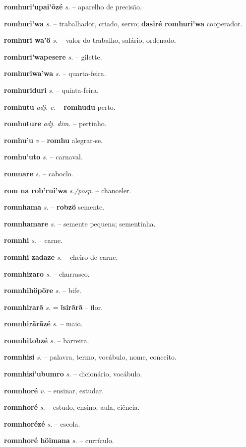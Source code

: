 \textbf{romhuri'upai'õzé} \textit{s.} -- aparelho de precisão.

\textbf{romhuri'wa} \textit{s.} -- trabalhador, criado, servo; \textbf{dasiré romhuri'wa} cooperador.

\textbf{romhuri wa'ö} \textit{s.} -- valor do trabalho, salário, ordenado.

\textbf{romhuri'wapesere} \textit{s.} -- gilette.

\textbf{romhuriwa'wa} \textit{s.} -- quarta-feira.

\textbf{romhuriduri} \textit{s.} -- quinta-feira.

\textbf{romhutu} \textit{adj. c.} -- \textbf{romhudu} perto.

\textbf{romhuture} \textit{adj. dim.} -- pertinho.

\textbf{romhu'u} \textit{v} -- \textbf{romhu} alegrar-se.

\textbf{romhu'uto} \textit{s.} -- carnaval.

\textbf{romnare} \textit{s.} -- caboclo.

\textbf{rom na rob'rui'wa} \textit{s./posp.} -- chanceler.

\textbf{romnhama} \textit{s.} -- \textbf{robzö} semente.

\textbf{romnhamare} \textit{s.} -- semente pequena; sementinha.

\textbf{romnhi} \textit{s.} -- carne.

\textbf{romnhi zadaze} \textit{s.} -- cheiro de carne.

\textbf{romnhizaro} \textit{s.} -- churrasco.

\textbf{romnhihöpöre} \textit{s.} -- bife.

\textbf{romnhirarã} \textit{s.} = \textbf{ĩsirãrã} -- flor.

\textbf{romnhirãrãzé} \textit{s.} -- maio.

\textbf{romnhitobzé} \textit{s.} -- barreira.

\textbf{romnhisi} \textit{s.} -- palavra, termo, vocábulo, nome, conceito.

\textbf{romnhisi'ubumro} \textit{s.} -- dicionário, vocábulo.

\textbf{romnhoré} \textit{v.} -- ensinar, estudar.

\textbf{romnhoré} \textit{s.} -- estudo, ensino, aula, ciência.

\textbf{romnhorézé} \textit{s.} -- escola.

\textbf{romnhoré höimana} \textit{s.} -- currículo.

